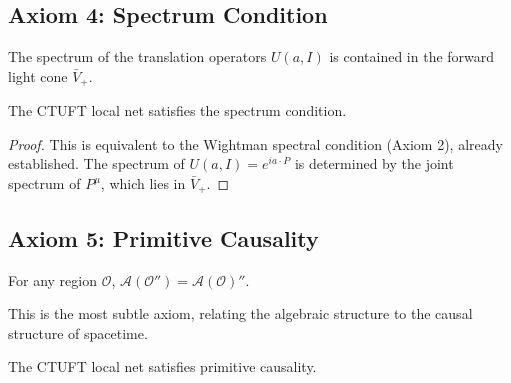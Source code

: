\subsection{Axiom 4: Spectrum Condition}

\begin{axiom}
The spectrum of the translation operators $U(a, I)$ is contained in the forward light cone $\bar{V}_+$.
\end{axiom}

\begin{theorem}
The CTUFT local net satisfies the spectrum condition.
\end{theorem}

\begin{proof}
This is equivalent to the Wightman spectral condition (Axiom 2), already established. The spectrum of $U(a, I) = e^{ia \cdot P}$ is determined by the joint spectrum of $P^\mu$, which lies in $\bar{V}_+$.
\end{proof}

\subsection{Axiom 5: Primitive Causality}

\begin{axiom}
For any region $\mathcal{O}$, $\mathcal{A}(\mathcal{O}'') = \mathcal{A}(\mathcal{O})''$.
\end{axiom}

This is the most subtle axiom, relating the algebraic structure to the causal structure of spacetime.

\begin{theorem}
The CTUFT local net satisfies primitive causality.
\end{theorem}

